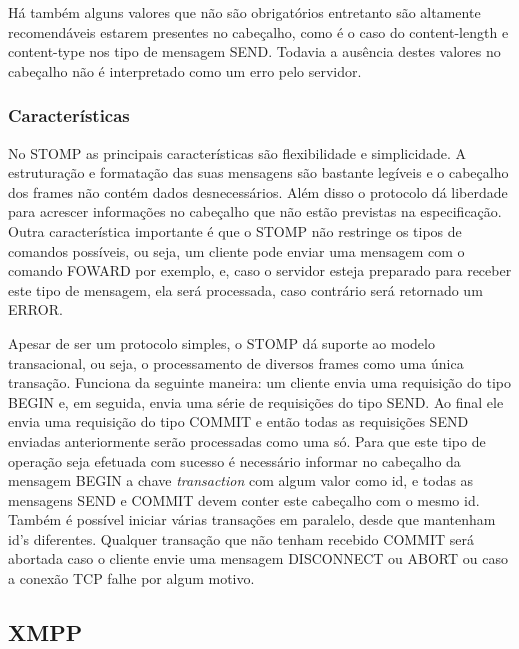 Há também alguns valores que não são obrigatórios entretanto são altamente recomendáveis estarem presentes no cabeçalho, como é o caso do  content-length e content-type nos tipo de mensagem SEND. Todavia a ausência destes valores no cabeçalho não é interpretado como um erro pelo servidor. 


\subsubsection*{Características}
No STOMP as principais características são flexibilidade e simplicidade. A estruturação e formatação das suas mensagens são bastante legíveis e o cabeçalho dos frames não contém dados desnecessários. Além disso o protocolo dá liberdade para acrescer informações no cabeçalho que não estão previstas na especificação. Outra característica importante é que o STOMP não restringe os tipos de comandos possíveis, ou seja, um cliente pode enviar uma mensagem com o comando FOWARD por exemplo, e, caso o servidor esteja preparado para receber este tipo de mensagem, ela será processada, caso contrário será retornado um ERROR.

Apesar de ser um protocolo simples, o STOMP dá suporte ao modelo transacional, ou seja, o processamento de diversos frames como uma única transação. Funciona da seguinte maneira: um cliente envia uma requisição do tipo BEGIN e, em seguida, envia uma série de requisições do tipo SEND. Ao final ele envia uma requisição do tipo COMMIT e então todas as requisições SEND enviadas anteriormente serão processadas como uma só. Para que este tipo de operação seja efetuada com sucesso é necessário informar no cabeçalho da mensagem BEGIN a chave \textit{transaction} com algum valor como id, e todas as mensagens SEND e COMMIT devem conter este cabeçalho com o mesmo id. Também é possível iniciar várias transações em paralelo, desde que mantenham id's diferentes. Qualquer transação que não tenham recebido COMMIT será abortada caso o cliente envie uma mensagem DISCONNECT ou ABORT ou caso a conexão TCP falhe por algum motivo.


\subsection{XMPP}
